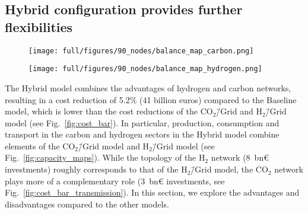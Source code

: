\documentclass[twocolumn]{article}
\newcommand{\COtwo}{CO$_2$}
\newcommand{\Htwo}{H$_2$}
\newcommand{\COgrid}{CO$_2$\=/Grid}
\newcommand{\modBase}{Baseline model}
\newcommand{\modH}{H$_2$\=/Grid model}
\newcommand{\modHybrid}{Hybrid model}
\newcommand{\carbon}{CO$_2$}
\newcommand{\hydrogen}{H$_2$}
\newcommand{\carbonmodel}{CO$_2$\=/Grid model}
\newcommand{\hydrogenmodel}{H$_2$\=/Grid model}
\newcommand{\hybridmodel}{Hybrid model}
\begin{document}
\subsection*{Hybrid configuration provides further flexibilities}\label{subsec:Hybrid}


\begin{figure*}[ht!]
    \centering
    \begin{subfigure}{.5\textwidth}
        \centering
        \texttt{[image: full/figures/90\_nodes/balance\_map\_carbon.png]}
        \label{fig:capacity_map_carbon_co2}
    \end{subfigure}%
    \begin{subfigure}{.5\textwidth}
        \centering
        \texttt{[image: full/figures/90\_nodes/balance\_map\_hydrogen.png]}
        \label{fig:capacity_map_hydrogen_co2}
    \end{subfigure}
    \caption{Optimal operation, flows and prices of the carbon (left) and hydrogen (right) sectors for the \hybridmodel{} in the net zero scenario. For each region, upper semicircles show the average production per technology, lower semicircles the consumption, and colors the average marginal prices. Carbon Sequestration offshore are drawn as full circles. Lines and arrows show the interregional transportation. \carbon{} from point-source in the inland either supplies local CU with imported \hydrogen{} or facilitates sequestration in nearby offshore regions.
    }
    \label{fig:capacity_maps}
\end{figure*}

The \modHybrid{} combines the advantages of hydrogen and carbon networks, resulting in a cost reduction of \label{}5.2\% (\label{}41 billion euros) compared to the \modBase{}, which is lower than the cost reductions of the \COgrid{} and \modH{} (see Fig.~\ref{fig:cost_bar}). In particular, production, consumption and transport in the carbon and hydrogen sectors in the \modHybrid{} combine elements of the \carbonmodel{} and \hydrogenmodel{} (see Fig.~\ref{fig:capacity_maps}). While the topology of the \Htwo{} network (8~bn€ investments) roughly corresponds to that of the \modH{}, the \COtwo{} network plays more of a complementary role (3~bn€ investments, see Fig.~\ref{fig:cost_bar_transmission}). In this section, we explore the advantages and disadvantages compared to the other models.
\end{document}
